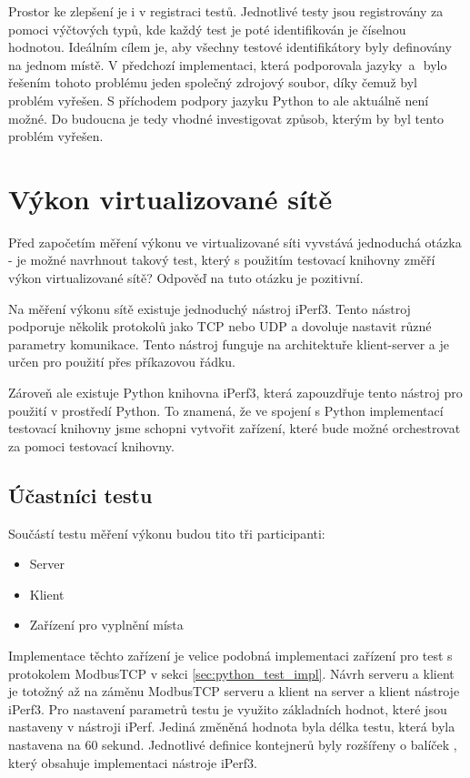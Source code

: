 Prostor ke zlepšení je i v registraci testů. Jednotlivé testy jsou registrovány za pomoci výčtových typů, kde každý test je poté identifikován je číselnou hodnotou. Ideálním cílem je, aby všechny testové identifikátory byly definovány na jednom místě. V předchozí implementaci, která podporovala jazyky \csharp\,a\,\cpp\, bylo řešením tohoto problému jeden společný zdrojový soubor, díky čemuž byl problém vyřešen. S příchodem podpory jazyku Python to ale aktuálně není možné. Do budoucna je tedy vhodné investigovat způsob, kterým by byl tento problém vyřešen.

\section{Výkon virtualizované sítě}

Před započetím měření výkonu ve virtualizované síti vyvstává jednoduchá otázka - je možné navrhnout takový test, který s použitím testovací knihovny změří výkon virtualizované sítě? Odpověď na tuto otázku je pozitivní. 

Na měření výkonu sítě existuje jednoduchý nástroj iPerf3. Tento nástroj podporuje několik protokolů jako TCP nebo UDP a dovoluje nastavit různé parametry komunikace. Tento nástroj funguje na architektuře klient-server a je určen pro použití přes příkazovou řádku.

Zároveň ale existuje Python knihovna iPerf3, která zapouzdřuje tento nástroj pro použití v prostředí Python. To znamená, že ve spojení s Python implementací testovací knihovny jsme schopni vytvořit zařízení, které bude možné orchestrovat za pomoci testovací knihovny.

\subsection{Účastníci testu}

Součástí testu měření výkonu budou tito tři participanti:

\begin{itemize}
    \item Server
    \item Klient
    \item Zařízení pro vyplnění místa
\end{itemize}

Implementace těchto zařízení je velice podobná implementaci zařízení pro test s protokolem ModbusTCP v sekci \ref{sec:python_test_impl}. Návrh serveru a klient je totožný až na záměnu ModbusTCP serveru a klient na server a klient nástroje iPerf3. Pro nastavení parametrů testu je využito základních hodnot, které jsou nastaveny v nástroji iPerf. Jediná změněná hodnota byla délka testu, která byla nastavena na 60 sekund. Jednotlivé definice kontejnerů byly rozšířeny o balíček , který obsahuje implementaci nástroje iPerf3. 

